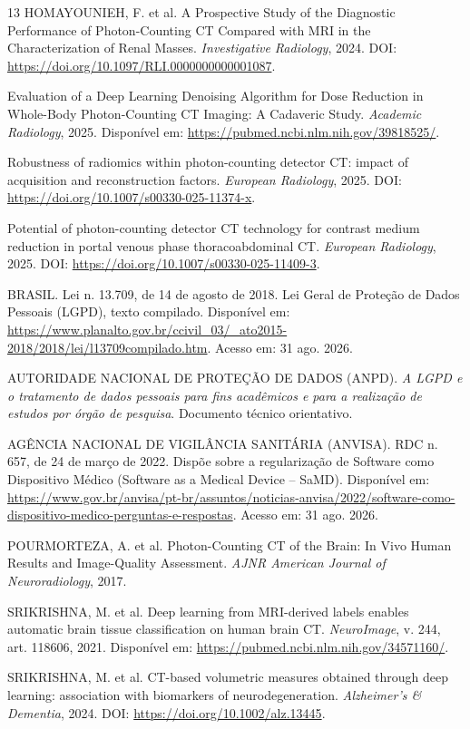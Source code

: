\documentclass[11pt,a4paper]{article}
\begin{document}
\begin{thebibliography}{13}
 HOMAYOUNIEH, F. et al. A Prospective Study of the Diagnostic Performance of Photon-Counting CT Compared with MRI in the Characterization of Renal Masses. \emph{Investigative Radiology}, 2024. DOI: \url{https://doi.org/10.1097/RLI.0000000000001087}.

 Evaluation of a Deep Learning Denoising Algorithm for Dose Reduction in Whole-Body Photon-Counting CT Imaging: A Cadaveric Study. \emph{Academic Radiology}, 2025. Disponível em: \url{https://pubmed.ncbi.nlm.nih.gov/39818525/}.

 Robustness of radiomics within photon-counting detector CT: impact of acquisition and reconstruction factors. \emph{European Radiology}, 2025. DOI: \url{https://doi.org/10.1007/s00330-025-11374-x}.

 Potential of photon-counting detector CT technology for contrast medium reduction in portal venous phase thoracoabdominal CT. \emph{European Radiology}, 2025. DOI: \url{https://doi.org/10.1007/s00330-025-11409-3}.

 BRASIL. Lei n. 13.709, de 14 de agosto de 2018. Lei Geral de Proteção de Dados Pessoais (LGPD), texto compilado. Disponível em: \url{https://www.planalto.gov.br/ccivil_03/_ato2015-2018/2018/lei/l13709compilado.htm}. Acesso em: 31 ago. 2026.

 AUTORIDADE NACIONAL DE PROTEÇÃO DE DADOS (ANPD). \emph{A LGPD e o tratamento de dados pessoais para fins acadêmicos e para a realização de estudos por órgão de pesquisa}. Documento técnico orientativo.

 AGÊNCIA NACIONAL DE VIGILÂNCIA SANITÁRIA (ANVISA). RDC n. 657, de 24 de março de 2022. Dispõe sobre a regularização de Software como Dispositivo Médico (Software as a Medical Device -- SaMD). Disponível em: \url{https://www.gov.br/anvisa/pt-br/assuntos/noticias-anvisa/2022/software-como-dispositivo-medico-perguntas-e-respostas}. Acesso em: 31 ago. 2026.

 POURMORTEZA, A. et al. Photon-Counting CT of the Brain: In Vivo Human Results and Image-Quality Assessment. \emph{AJNR American Journal of Neuroradiology}, 2017.

 SRIKRISHNA, M. et al. Deep learning from MRI-derived labels enables automatic brain tissue classification on human brain CT. \emph{NeuroImage}, v. 244, art. 118606, 2021. Disponível em: \url{https://pubmed.ncbi.nlm.nih.gov/34571160/}.

 SRIKRISHNA, M. et al. CT-based volumetric measures obtained through deep learning: association with biomarkers of neurodegeneration. \emph{Alzheimer's \& Dementia}, 2024. DOI: \url{https://doi.org/10.1002/alz.13445}.

\end{thebibliography}
\end{document}
